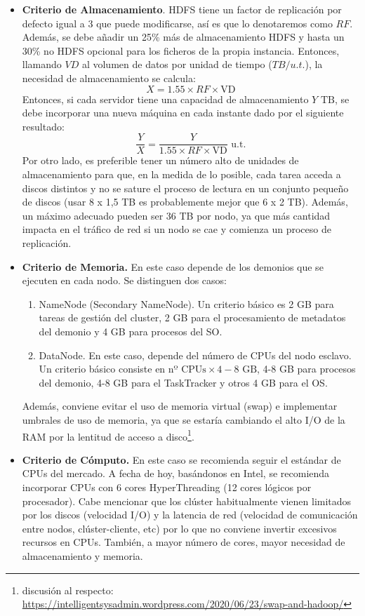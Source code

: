 \begin{itemize}
	\item \textbf{Criterio de Almacenamiento}. HDFS tiene un factor de replicación por defecto igual a 3 que puede modificarse, así es que lo denotaremos como $RF$. Además, se debe añadir un 25\% más de almacenamiento HDFS y hasta un 30\% no HDFS opcional para los ficheros de la propia instancia. Entonces, llamando $VD$ al volumen de datos por unidad de tiempo ($TB/u.t.$), la necesidad de almacenamiento se calcula:
	$$X = 1.55\times RF \times \textrm{VD}$$
	Entonces, si cada servidor tiene una capacidad de almacenamiento $Y \textrm{ TB}$, se debe incorporar una nueva máquina en cada instante dado por el siguiente resultado:
	$$\frac{Y}{X} = \frac{Y}{1.55\times RF \times \textrm{VD}}\textrm{ u.t.}$$
	Por otro lado, es preferible tener un número alto de unidades de almacenamiento para que, en la medida de lo posible, cada tarea acceda a discos distintos y no se sature el proceso de lectura en un conjunto pequeño de discos (usar 8 x 1,5 TB es probablemente mejor que 6 x 2 TB). Además, un máximo adecuado pueden ser 36 TB por nodo, ya que más cantidad impacta en el tráfico de red si un nodo se cae y comienza un proceso de replicación.
	\item \textbf{Criterio de Memoria.} En este caso depende de los demonios que se ejecuten en cada nodo. Se distinguen dos casos:
	\begin{enumerate}
		\item NameNode (Secondary NameNode). Un criterio básico es 2 GB para tareas de gestión del cluster, 2 GB para el procesamiento de metadatos del demonio y 4 GB para procesos del SO.
		\item DataNode. En este caso, depende del número de CPUs del nodo esclavo. Un criterio básico consiste en 
		$\textrm{nº CPUs} \times 4-8 \textrm{ GB}$, 4-8 GB para procesos del demonio, 4-8 GB para el TaskTracker y otros 4 GB para el OS.  
	\end{enumerate}
	Además, conviene evitar el uso de memoria virtual (swap) e implementar umbrales de uso de memoria, ya que se estaría cambiando el alto I/O de la RAM por la lentitud de acceso a disco\footnote{discusión al respecto: \url{https://intelligentsysadmin.wordpress.com/2020/06/23/swap-and-hadoop/}}. 
	\item \textbf{Criterio de Cómputo.} En este caso se recomienda seguir el estándar de CPUs del mercado. A fecha de hoy, basándonos en Intel, se recomienda incorporar CPUs con 6 cores HyperThreading (12 cores lógicos por procesador). Cabe mencionar que los clúster habitualmente vienen limitados por los discos (velocidad I/O) y la latencia de red (velocidad de comunicación entre nodos, clúster-cliente, etc) por lo que no conviene invertir excesivos recursos en CPUs. También, a mayor número de cores, mayor necesidad de almacenamiento y memoria.
\end{itemize}
